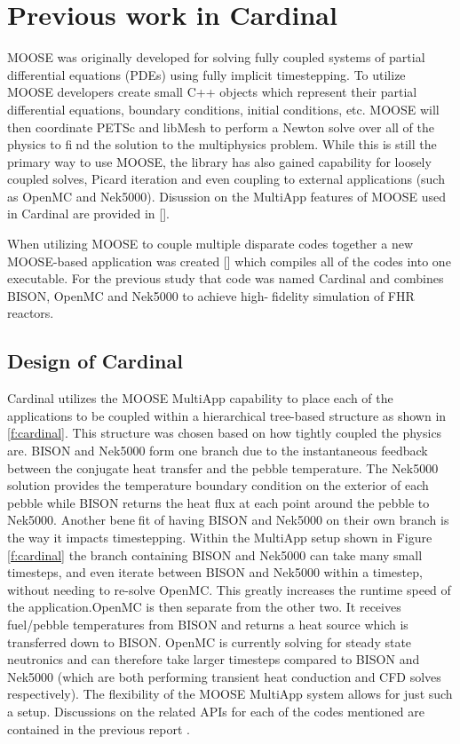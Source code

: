 \section{Previous work in Cardinal}
\label{s:cardinal}

MOOSE was originally developed for solving fully coupled systems of partial differential equations (PDEs)
using fully implicit timestepping. To utilize MOOSE developers create small C++ objects which represent
their partial differential equations, boundary conditions, initial conditions, etc. MOOSE will then coordinate PETSc and libMesh to perform a Newton solve over all of the physics to find the solution to the multiphysics problem. While this is still the primary way to use MOOSE, the library has also gained capability for loosely coupled solves, Picard iteration and even coupling to external applications (such as OpenMC and Nek5000).
Disussion on the MultiApp features of MOOSE used in Cardinal are provided in [].

When utilizing MOOSE to couple multiple disparate codes together a new MOOSE-based application was created [] which compiles all of the codes into one executable. For the previous study that code was  named Cardinal and combines BISON, OpenMC and Nek5000 to achieve high-fidelity simulation of FHR reactors.

\subsection{Design of Cardinal}
\label{ss:c1}

Cardinal utilizes the MOOSE MultiApp capability to place each of the applications to be coupled within
a hierarchical tree-based structure as shown in \ref{f:cardinal}. This structure was chosen based on how tightly
coupled the physics are. BISON and Nek5000 form one branch due to the instantaneous feedback between the conjugate heat transfer and the pebble temperature. The Nek5000 solution provides the temperature boundary condition on the exterior of each pebble while BISON returns the heat  flux at each point around
the pebble to Nek5000. Another benefit of having BISON and Nek5000 on their own branch is the way it impacts timestepping. Within the MultiApp setup shown in Figure \ref{f:cardinal} the branch containing BISON and Nek5000 can take many small timesteps, and even iterate between BISON and Nek5000 within a timestep, without needing to re-solve OpenMC. This greatly increases the runtime speed of the application.OpenMC is then separate from the other two. It receives fuel/pebble temperatures from BISON and returns a heat source which is transferred down to BISON. OpenMC is currently solving for steady state neutronics and can therefore take larger timesteps compared to BISON and Nek5000 (which are both performing transient heat conduction and CFD solves respectively). The flexibility of the MOOSE MultiApp system allows for just such a setup. Discussions on the related APIs for each of the codes mentioned are contained in the previous report \cite{cardinal}.

